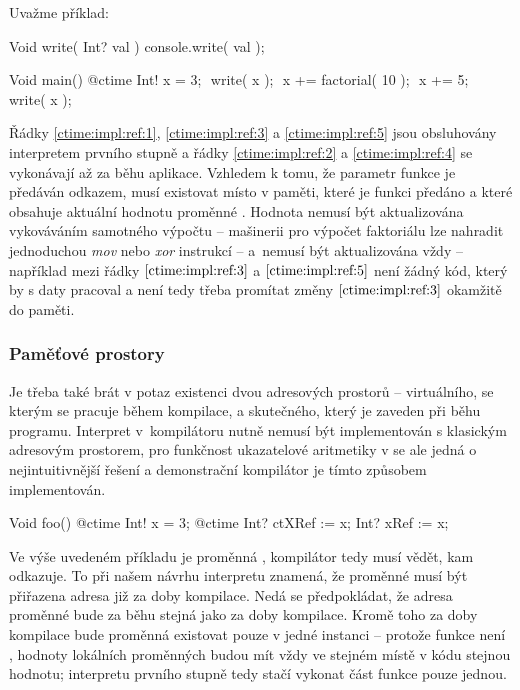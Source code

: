 Uvažme příklad:

\begin{code}
Void write( Int? val ) {
	console.write( val );
}
	
Void main() {
	@ctime Int! x = 3; $\label{ctime:impl:ref:1}$
	write( x ); $\label{ctime:impl:ref:2}$
	x += factorial( 10 ); $\label{ctime:impl:ref:3}$
	x += 5; $\label{ctime:impl:ref:5}$
	write( x ); $\label{ctime:impl:ref:4}$
}
\end{code}

Řádky \ref{ctime:impl:ref:1}, \ref{ctime:impl:ref:3} a \ref{ctime:impl:ref:5} jsou obsluhovány interpretem prvního stupně a řádky \ref{ctime:impl:ref:2} a \ref{ctime:impl:ref:4} se vykonávají až za běhu aplikace. Vzhledem k tomu, že parametr funkce  je předáván odkazem, musí existovat místo v paměti, které je funkci předáno a které obsahuje aktuální hodnotu proměnné . Hodnota nemusí být aktualizována vykováváním samotného výpočtu -- mašinerii pro výpočet faktoriálu lze nahradit jednoduchou \textit{mov} nebo \textit{xor} instrukcí -- a~nemusí být aktualizována vždy -- například mezi řádky $\ref{ctime:impl:ref:3}$ a $\ref{ctime:impl:ref:5}$ není žádný \nonctime kód, který by s daty pracoval a není tedy třeba promítat změny $\ref{ctime:impl:ref:3}$ okamžitě do paměti. 

\subsubsection{Paměťové prostory}
Je třeba také brát v potaz existenci dvou adresových prostorů -- virtuálního, se kterým se pracuje během kompilace, a skutečného, který je zaveden při běhu programu. Interpret v~kompilátoru nutně nemusí být implementován s klasickým adresovým prostorem, pro funkčnost ukazatelové aritmetiky v \ctime se ale jedná o nejintuitivnější řešení a demonstrační kompilátor je tímto způsobem implementován.

\begin{code}
Void foo() {
	@ctime Int! x = 3;
	@ctime Int? ctXRef := x;
	Int? xRef := x;
}
\end{code}

Ve výše uvedeném příkladu je proměnná  \ctime, kompilátor tedy musí vědět, kam odkazuje. To při našem návrhu interpretu znamená, že proměnné  musí být přiřazena adresa již za doby kompilace. Nedá se předpokládat, že adresa proměnné  bude za běhu stejná jako za doby kompilace. Kromě toho za doby kompilace bude proměnná  existovat pouze v jedné instanci -- protože funkce  není \ctime, hodnoty lokálních \ctime proměnných budou mít vždy ve stejném místě v kódu stejnou hodnotu; interpretu prvního stupně tedy stačí vykonat \ctime část funkce pouze jednou.

